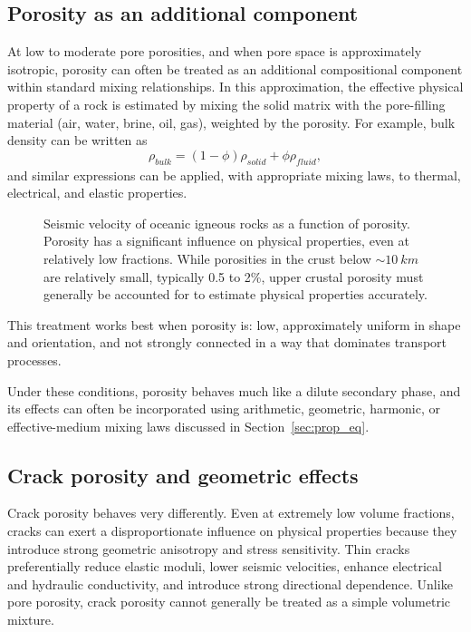 \subsection{Porosity as an additional component}

At low to moderate pore porosities, and when pore space is approximately isotropic, porosity can often be treated as an additional compositional component within standard mixing relationships. In this approximation, the effective physical property of a rock is estimated by mixing the solid matrix with the pore-filling material (air, water, brine, oil, gas), weighted by the porosity. For example, bulk density can be written as
\begin{equation}
    \rho_{\textit{bulk}} = (1 - \phi)\rho_{\textit{solid}} + \phi \rho_{\textit{fluid}},
\end{equation}
and similar expressions can be applied, with appropriate mixing laws, to thermal, electrical, and elastic properties.
\begin{figure}[tbh]
    \centering
    \caption{Seismic velocity of oceanic igneous rocks as a function of porosity.  Porosity has a significant influence on physical properties, even at relatively low fractions.  While porosities in the crust below $\sim\SI{10}{km}$ are relatively small, typically 0.5 to 2\%, upper crustal porosity must generally be accounted for to estimate physical properties accurately.}
    \label{fig:porosity}
\end{figure}

This treatment works best when porosity is: low, approximately uniform in shape and orientation, and not strongly connected in a way that dominates transport processes.

Under these conditions, porosity behaves much like a dilute secondary phase, and its effects can often be incorporated using arithmetic, geometric, harmonic, or effective-medium mixing laws discussed in Section~\ref{sec:prop_eq}.

\subsection{Crack porosity and geometric effects}
Crack porosity behaves very differently. Even at extremely low volume fractions, cracks can exert a disproportionate influence on physical properties because they introduce strong geometric anisotropy and stress sensitivity. Thin cracks preferentially reduce elastic moduli, lower seismic velocities, enhance electrical and hydraulic conductivity, and introduce strong directional dependence. Unlike pore porosity, crack porosity cannot generally be treated as a simple volumetric mixture.

